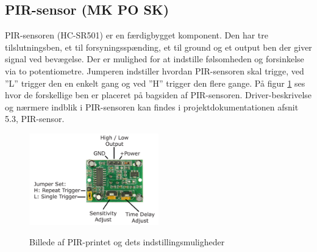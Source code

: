 \subsection{PIR-sensor (MK PO SK)}

PIR-sensoren (HC-SR501) er en færdigbygget komponent. Den har tre tilslutningsben, et til forsyningsspænding, et til ground og et output ben der giver signal ved bevægelse. Der er mulighed for at indstille følsomheden og forsinkelse via to potentiometre. Jumperen indstiller hvordan PIR-sensoren skal trigge, ved ''L'' trigger den en enkelt gang og ved ''H'' trigger den flere gange. På figur \ref{lab:pir_overview} ses hvor de forskellige ben er placeret på bagsiden af PIR-sensoren. Driver-beskrivelse og nærmere indblik i PIR-sensoren kan findes i projektdokumentationen afsnit 5.3, PIR-sensor.

\begin{figure}[H] \centering
{\includegraphics[width=0.5\textwidth]{Billeder/pir_overview}}
\caption{Billede af PIR-printet og dets indstillingsmuligheder}
\label{lab:pir_overview}
\raggedright
\end{figure}



